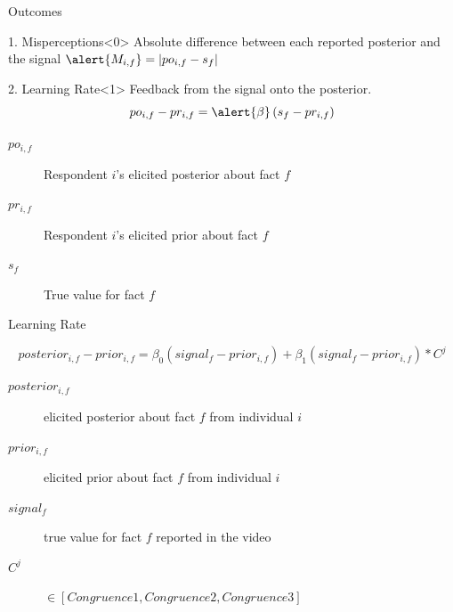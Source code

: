 \documentclass[10pt]{beamer}
\begin{document}
\begin{frame}{Outcomes}
\begin{block}{1. Misperceptions}<0>
Absolute difference between each reported posterior and the signal 
$\alert{M_{i,f}} = |po_{i,f} - s_f|$
\end{block}

\begin{block}{2. Learning Rate}<1>
Feedback from the signal onto the posterior.
\begin{equation*}
    po_{i,f} - pr_{i,f} = \alert{\beta} \left( s_f - pr_{i,f}\right)
    \label{eq: learningrate}
  \end{equation*}
\end{block}


\begin{description}
  \item[$po_{i,f}$] Respondent $i$'s elicited posterior about fact $f$
  \item[$pr_{i,f}$] Respondent $i$'s elicited prior about fact $f$
  \item[$s_f$] True value for fact $f$
\end{description}
\end{frame}


\begin{frame}{Learning Rate}
\label{eq_learning}
\begin{center}
\end{center}
\begin{equation*}
    posterior_{i,f} - prior_{i,f} = \beta_0 \left( signal_{f} - prior_{i,f}\right)+  \beta_1 \left( signal_{f} - prior_{i,f}\right) *C^{j}
  \end{equation*}
      \begin{description}
\item[$posterior_{i,f}$]  elicited posterior about fact $f$ from individual $i$
\item[$prior_{i,f}$] elicited prior about fact $f$ from individual $i$
\item[$signal_{f}$] true value for fact $f$ reported in the video
\item[$C^{j}$] $\in [Congruence1, Congruence2, Congruence3]$ 
      \end{description}
\hfill \hyperlink{regressioneq}{}
\end{frame}
\end{document}
